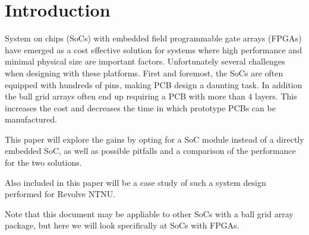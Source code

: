 \section{Introduction}

System on chips (SoCs) with embedded field programmable gate arrays (FPGAs) have emerged as a cost effective solution for systems where high performance and minimal physical size are important factors. Unfortunately several challenges when designing with these platforms. First and foremost, the SoCs are often equipped with hundreds of pins, making PCB design a daunting task. In addition the ball grid arrays often end up requiring a PCB with more than 4 layers. This increases the cost and decreases the time in which prototype PCBs can be manufactured.

This paper will explore the gains by opting for a SoC module instead of a directly embedded SoC, as well as possible pitfalls and a comparison of the performance for the two solutions.

Also included in this paper will be a case study of such a system design performed for Revolve NTNU.

Note that this document may be appliable to other SoCs with a ball grid array package, but here we will look specifically at SoCs with FPGAs.